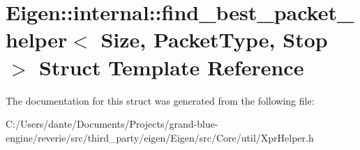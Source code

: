 \hypertarget{struct_eigen_1_1internal_1_1find__best__packet__helper}{}\section{Eigen\+::internal\+::find\+\_\+best\+\_\+packet\+\_\+helper$<$ Size, Packet\+Type, Stop $>$ Struct Template Reference}
\label{struct_eigen_1_1internal_1_1find__best__packet__helper}


The documentation for this struct was generated from the following file\+:\begin{DoxyCompactItemize}
\item 
C\+:/\+Users/dante/\+Documents/\+Projects/grand-\/blue-\/engine/reverie/src/third\+\_\+party/eigen/\+Eigen/src/\+Core/util/Xpr\+Helper.\+h\end{DoxyCompactItemize}
